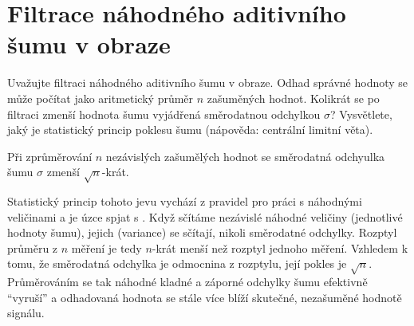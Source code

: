 \section{Filtrace náhodného aditivního šumu v obraze}
Uvažujte filtraci náhodného aditivního šumu v obraze. Odhad správné hodnoty se může počítat jako aritmetický průměr $n$ 
zašuměných hodnot. Kolikrát se po filtraci zmenší hodnota šumu vyjádřená směrodatnou odchylkou $\sigma$? Vysvětlete, 
jaký je statistický princip poklesu šumu (nápověda: centrální limitní věta).

Při zprůměrování $n$ nezávislých zašumělých hodnot se směrodatná odchyulka šumu $\sigma$ zmenší $\sqrt{n}$-krát.

Statistický princip tohoto jevu vychází z pravidel pro práci s náhodnými veličinami a je úzce spjat s . Když sčítáme nezávislé náhodné veličiny (jednotlivé hodnoty šumu), jejich  (variance) se 
sčítají, nikoli směrodatné odchylky. Rozptyl průměru z $n$ měření je tedy $n$-krát menší než rozptyl jednoho měření. 
Vzhledem k tomu, že směrodatná odchylka je odmocnina z rozptylu, její pokles je $\sqrt{n}$. Průměrováním se tak náhodné 
kladné a záporné odchylky šumu efektivně \enquote{vyruší} a odhadovaná hodnota se stále více blíží skutečné, nezašuměné 
hodnotě signálu.